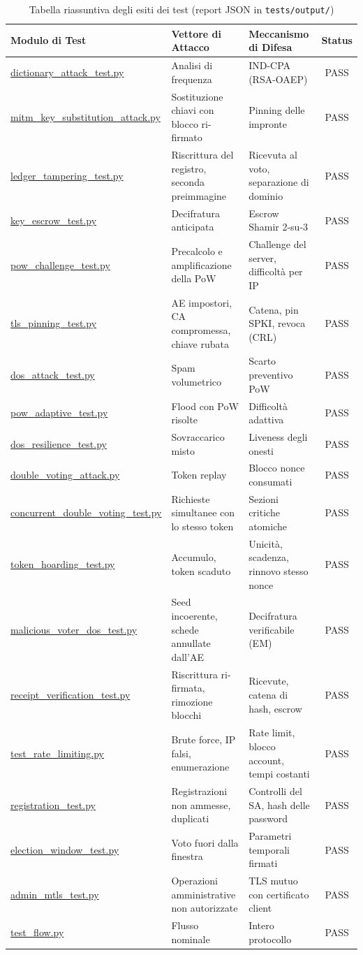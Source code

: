 \documentclass[12pt,a4paper]{article}
\begin{document}
\begin{table}[!ht]
\centering
\scriptsize
\setlength{\tabcolsep}{3pt}
\begin{tabularx}{\textwidth}{Y Y Y c}
\toprule
\textbf{Modulo di Test} & \textbf{Vettore di Attacco} & \textbf{Meccanismo di Difesa} & \textbf{Status} \\
\midrule
\url{dictionary_attack_test.py} & Analisi di frequenza & IND-CPA (RSA-OAEP) & PASS \\
\url{mitm_key_substitution_attack.py} & Sostituzione chiavi con blocco ri-firmato & Pinning delle impronte & PASS \\
\url{ledger_tampering_test.py} & Riscrittura del registro, seconda preimmagine & Ricevuta al voto, separazione di dominio & PASS \\
\url{key_escrow_test.py} & Decifratura anticipata & Escrow Shamir 2-su-3 & PASS \\
\url{pow_challenge_test.py} & Precalcolo e amplificazione della PoW & Challenge del server, difficoltà per IP & PASS \\
\url{tls_pinning_test.py} & AE impostori, CA compromessa, chiave rubata & Catena, pin SPKI, revoca (CRL) & PASS \\
\url{dos_attack_test.py} & Spam volumetrico & Scarto preventivo PoW & PASS \\
\url{pow_adaptive_test.py} & Flood con PoW risolte & Difficoltà adattiva & PASS \\
\url{dos_resilience_test.py} & Sovraccarico misto & Liveness degli onesti & PASS \\
\url{double_voting_attack.py} & Token replay & Blocco nonce consumati & PASS \\
\url{concurrent_double_voting_test.py} & Richieste simultanee con lo stesso token & Sezioni critiche atomiche & PASS \\
\url{token_hoarding_test.py} & Accumulo, token scaduto & Unicità, scadenza, rinnovo stesso nonce & PASS \\
\url{malicious_voter_dos_test.py} & Seed incoerente, schede annullate dall'AE & Decifratura verificabile (EM) & PASS \\
\url{receipt_verification_test.py} & Riscrittura ri-firmata, rimozione blocchi & Ricevute, catena di hash, escrow & PASS \\
\url{test_rate_limiting.py} & Brute force, IP falsi, enumerazione & Rate limit, blocco account, tempi costanti & PASS \\
\url{registration_test.py} & Registrazioni non ammesse, duplicati & Controlli del SA, hash delle password & PASS \\
\url{election_window_test.py} & Voto fuori dalla finestra & Parametri temporali firmati & PASS \\
\url{admin_mtls_test.py} & Operazioni amministrative non autorizzate & TLS mutuo con certificato client & PASS \\
\url{test_flow.py} & Flusso nominale & Intero protocollo & PASS \\
\bottomrule
\end{tabularx}
\caption{Tabella riassuntiva degli esiti dei test (report JSON in \texttt{tests/output/})}
\label{tab:esiti_test}
\end{table}
\end{document}
